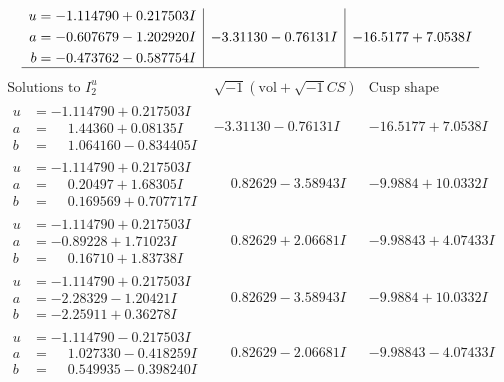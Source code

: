 \documentclass[1p]{elsarticle_modified}
\theoremstyle{definition}
\newcommand{\I}{\sqrt{-1}}
\begin{document}
$$\begin{array}{c|c|c}
\begin{aligned}
u &= -1.114790 + 0.217503 I \\
a &= -0.607679 - 1.202920 I \\
b &= -0.473762 - 0.587754 I\end{aligned}
 & -3.31130 - 0.76131 I & -16.5177 + 7.0538 I\\
 \hline 
 \end{array}$$\newpage$$\begin{array}{c|c|c}  
\text{Solutions to }I^u_{2}& \I (\text{vol} + \sqrt{-1}CS) & \text{Cusp shape}\\
 \hline 
\begin{aligned}
u &= -1.114790 + 0.217503 I \\
a &= \phantom{-}1.44360 + 0.08135 I \\
b &= \phantom{-}1.064160 - 0.834405 I\end{aligned}
 & -3.31130 - 0.76131 I & -16.5177 + 7.0538 I \\ \hline\begin{aligned}
u &= -1.114790 + 0.217503 I \\
a &= \phantom{-}0.20497 + 1.68305 I \\
b &= \phantom{-}0.169569 + 0.707717 I\end{aligned}
 & \phantom{-}0.82629 - 3.58943 I & -9.9884 + 10.0332 I \\ \hline\begin{aligned}
u &= -1.114790 + 0.217503 I \\
a &= -0.89228 + 1.71023 I \\
b &= \phantom{-}0.16710 + 1.83738 I\end{aligned}
 & \phantom{-}0.82629 + 2.06681 I & -9.98843 + 4.07433 I \\ \hline\begin{aligned}
u &= -1.114790 + 0.217503 I \\
a &= -2.28329 - 1.20421 I \\
b &= -2.25911 + 0.36278 I\end{aligned}
 & \phantom{-}0.82629 - 3.58943 I & -9.9884 + 10.0332 I \\ \hline\begin{aligned}
u &= -1.114790 - 0.217503 I \\
a &= \phantom{-}1.027330 - 0.418259 I \\
b &= \phantom{-}0.549935 - 0.398240 I\end{aligned}
 & \phantom{-}0.82629 - 2.06681 I & -9.98843 - 4.07433 I \\ \hline\begin{aligned}

\end{aligned}
\end{array}$$
\end{document}
